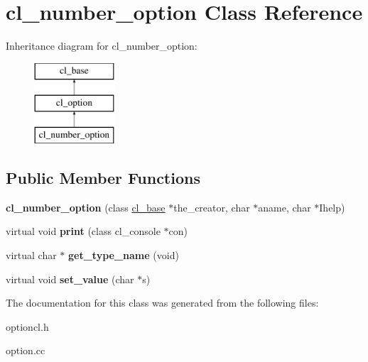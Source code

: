 \hypertarget{classcl__number__option}{
\section{cl\_\-number\_\-option Class Reference}
\label{classcl__number__option}
}
Inheritance diagram for cl\_\-number\_\-option:\begin{figure}[H]
\begin{center}
\leavevmode
\includegraphics[height=3.000000cm]{classcl__number__option}
\end{center}
\end{figure}
\subsection*{Public Member Functions}
\begin{DoxyCompactItemize}
\item 
\hypertarget{classcl__number__option_abe01b67a88d03bd49b3b7f8057e68c8e}{
{\bfseries cl\_\-number\_\-option} (class \hyperlink{classcl__base}{cl\_\-base} $\ast$the\_\-creator, char $\ast$aname, char $\ast$Ihelp)}
\label{classcl__number__option_abe01b67a88d03bd49b3b7f8057e68c8e}

\item 
\hypertarget{classcl__number__option_a8e5f72c9f87729e2532589f076dffe28}{
virtual void {\bfseries print} (class cl\_\-console $\ast$con)}
\label{classcl__number__option_a8e5f72c9f87729e2532589f076dffe28}

\item 
\hypertarget{classcl__number__option_a158af3f1fee1a1f9acffa9eb1a1a4b3b}{
virtual char $\ast$ {\bfseries get\_\-type\_\-name} (void)}
\label{classcl__number__option_a158af3f1fee1a1f9acffa9eb1a1a4b3b}

\item 
\hypertarget{classcl__number__option_a4c3464a6b48f0d6daa547bcba3b15402}{
virtual void {\bfseries set\_\-value} (char $\ast$s)}
\label{classcl__number__option_a4c3464a6b48f0d6daa547bcba3b15402}

\end{DoxyCompactItemize}


The documentation for this class was generated from the following files:\begin{DoxyCompactItemize}
\item 
optioncl.h\item 
option.cc\end{DoxyCompactItemize}
